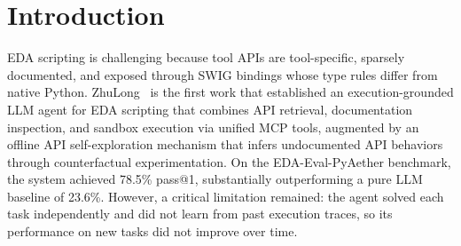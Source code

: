 \section{Introduction}
\label{sec:introduction}

EDA scripting is challenging because tool APIs are tool-specific, sparsely documented, and exposed through SWIG bindings whose type rules differ from native Python. ZhuLong~\cite{liu2026zhulong} is the first work that established an execution-grounded LLM agent for EDA scripting that combines API retrieval, documentation inspection, and sandbox execution via unified MCP tools, augmented by an offline API self-exploration mechanism that infers undocumented API behaviors through counterfactual experimentation. On the EDA-Eval-PyAether benchmark, the system achieved 78.5\% pass@1, substantially outperforming a pure LLM baseline of 23.6\%. However, a critical limitation remained: the agent solved each task independently and did not learn from past execution traces, so its performance on new tasks did not improve over time.

